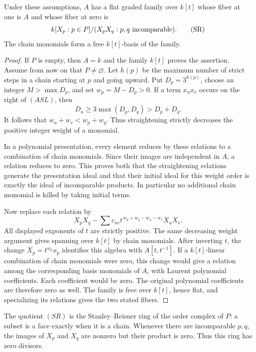 \begin{proposition}
Under these assumptions, \(A\) has a flat
graded family over \(k[t]\) whose fiber at
one is \(A\) and whose fiber at zero is
\[
 k[X_p:p\in P]/
        (X_pX_q:p,q\hbox{ incomparable}).
 \tag{SR}
\]
The chain monomials form a free \(k[t]\)-basis
of the family.
\end{proposition}
\begin{proof}
If \(P\) is empty, then \(A=k\) and the family \(k[t]\)
proves the assertion. Assume from now on that \(P\ne\varnothing\).
Let \(h(p)\) be the maximum number of strict
steps in a chain starting at \(p\) and going
upward.  Put \(D_p=3^{h(p)}\), choose an integer
\(M>\max D_p\), and set \(w_p=M-D_p>0\).
If a term \(x_ux_v\) occurs on the right
of \((ASL)\), then
\[
 D_u\ge3\max(D_p,D_q)>D_p+D_q.
\]
It follows that \(w_u+w_v<w_p+w_q\).
Thus straightening strictly decreases the
positive integer weight of a monomial.

In a polynomial presentation, every element
reduces by these relations to a combination
of chain monomials.  Since their images
are independent in \(A\), a relation reduces
to zero.  This proves both that the
straightening relations generate the
presentation ideal and that their initial
ideal for this weight order is exactly
the ideal of incomparable products.
In particular no additional chain monomial
is killed by taking initial terms.

Now replace each relation by
\[
 X_pX_q-\sum c_{uv}
       t^{\,w_p+w_q-w_u-w_v}X_uX_v.
 \]
All displayed exponents of \(t\) are
strictly positive.  The same decreasing
weight argument gives spanning over
\(k[t]\) by chain monomials.  After
inverting \(t\), the change
\(X_p=t^{w_p}x_p\) identifies this
algebra with \(A[t,t^{-1}]\).
If a \(k[t]\)-linear combination of
chain monomials were zero, this change
would give a relation among the
corresponding basis monomials of \(A\),
with Laurent polynomial coefficients.
Each coefficient would be zero.
The original polynomial coefficients
are therefore zero as well.
The family is free over \(k[t]\), hence
flat, and specializing its relations
gives the two stated fibers.
\end{proof}

The quotient \((SR)\) is the
Stanley--Reisner ring of the order
complex of \(P\): a subset is a face
exactly when it is a chain.  Whenever
there are incomparable \(p,q\), the
images of \(X_p\) and \(X_q\) are
nonzero but their product is zero.
Thus this ring has zero divisors.


